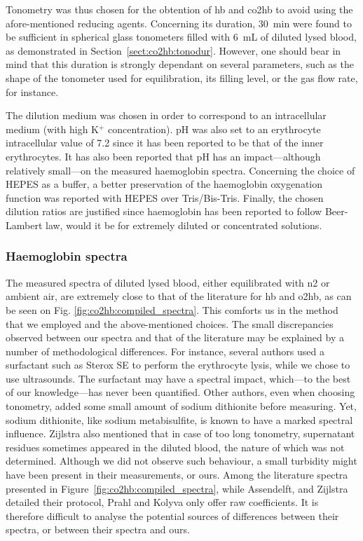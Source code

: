 Tonometry was thus chosen for the obtention of \gls{hb} and \gls{co2hb} to avoid using the afore-mentioned reducing agents. Concerning its duration, 30~min were found to be sufficient in spherical glass tonometers filled with 6~mL of diluted lysed blood, as demonstrated in Section~\ref{sect:co2hb:tonodur}. However, one should bear in mind that this duration is strongly dependant on several parameters, such as the shape of the tonometer used for equilibration, its filling level, or the gas flow rate, for instance.

The dilution medium was chosen in order to correspond to an intracellular medium (with high K$^+$ concentration). pH was also set to an erythrocyte intracellular value of 7.2 since it has been reported to be that of the inner erythrocytes\cite{jensen2004, kummerow2000}. It has also been reported that pH has an impact---although relatively small---on the measured haemoglobin spectra\cite{dalziel1957, wimberley1988, zijlstra1997}. Concerning the choice of HEPES as a buffer, a better preservation of the haemoglobin oxygenation function was reported with HEPES over Tris/Bis-Tris\cite{weber1992}. Finally, the chosen dilution ratios are justified since haemoglobin has been reported to follow Beer-Lambert law, would it be for extremely diluted or concentrated solutions\cite{drabkin1935}.

\subsubsection{Haemoglobin spectra}

The measured spectra of diluted lysed blood, either equilibrated with \gls{n2} or ambient air, are extremely close to that of the literature for \gls{hb} and \gls{o2hb}, as can be seen on Fig. \ref{fig:co2hb:compiled_spectra}. This comforts us in the method that we employed and the above-mentioned choices. The small discrepancies observed between our spectra and that of the literature may be explained by a number of methodological differences. For instance, several authors\cite{assendelft1970, mook1979, zijlstra1991} used a surfactant such as Sterox SE to perform the erythrocyte lysis, while we chose to use ultrasounds. The surfactant may have a spectral impact, which---to the best of our knowledge---has never been quantified. Other authors, even when choosing tonometry, added some small amount of sodium dithionite before measuring\cite{zijlstra2000}. Yet, sodium dithionite, like sodium metabisulfite, is known to have a marked spectral influence\cite{dalziel1957}. Zijlstra \etal{}\cite{zijlstra2000} also mentioned that in case of too long tonometry, supernatant residues sometimes appeared in the diluted blood, the nature of which was not determined. Although we did not observe such behaviour, a small turbidity might have been present in their measurements, or ours. Among the literature spectra presented in Figure~\ref{fig:co2hb:compiled_spectra}, while Assendelft, and Zijlstra detailed their protocol, Prahl and Kolyva only offer raw coefficients. It is therefore difficult to analyse the potential sources of differences between their spectra, or between their spectra and ours.

